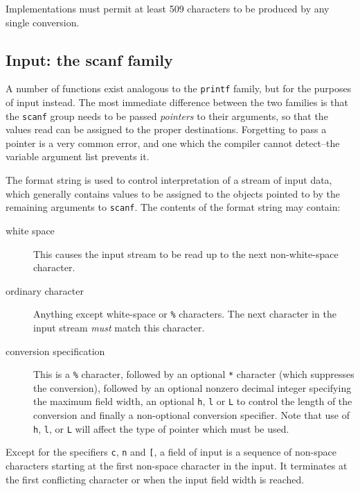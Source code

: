    Implementations must permit at least 509 characters  to  be
    produced by any single conversion.


  

  \subsection{Input: the scanf family}
   

   A number of functions exist analogous to the \texttt{printf} family,
    but for the purposes of input instead.  The most immediate difference
    between the two families is that the \texttt{scanf} group needs to be
    passed \textit{pointers} to their arguments, so that the values read can be
    assigned to the proper destinations.  Forgetting to pass a pointer is
    a very common error, and one which the compiler cannot detect--the
    variable argument list prevents it.


   The format string is used to control interpretation of a stream of input
    data, which generally contains values to be assigned to the objects pointed
    to by the remaining arguments to \texttt{scanf}.  The contents of the
    format string may contain:


   \begin{description}
    \item[white space] This causes the input stream to be read up to the next
     non-white-space character.

    \item[ordinary character] Anything except white-space or \texttt{\%} characters.  The next
     character in the input stream \textit{must} match this character.

    \item[conversion specification] This is a \texttt{\%} character, followed by an optional
     \texttt{*} character (which suppresses the conversion), followed by
     an optional nonzero decimal integer specifying the maximum field width,
     an optional \texttt{h}, \texttt{l} or \texttt{L} to control
     the length of the conversion and finally a non-optional conversion
     specifier.  Note that use of \texttt{h}, \texttt{l}, or
     \texttt{L} will affect the type of pointer which must be used.
   \end{description}

   Except for the specifiers \texttt{c}, \texttt{n} and
    \texttt{[}, a field of input is a sequence of non-space characters
    starting at the first non-space character in the input.  It terminates at
    the first conflicting character or when the input field width is
    reached.



